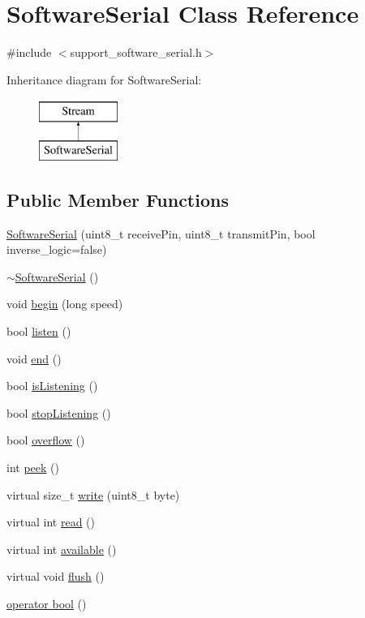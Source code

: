 \hypertarget{class_software_serial}{}\section{Software\+Serial Class Reference}
\label{class_software_serial}


{\ttfamily \#include $<$support\+\_\+software\+\_\+serial.\+h$>$}

Inheritance diagram for Software\+Serial\+:\begin{figure}[H]
\begin{center}
\leavevmode
\includegraphics[height=2.000000cm]{class_software_serial}
\end{center}
\end{figure}
\subsection*{Public Member Functions}
\begin{DoxyCompactItemize}
\item 
\hyperlink{class_software_serial_aab36336db4a1ca5073071c07d910cb87}{Software\+Serial} (uint8\+\_\+t receive\+Pin, uint8\+\_\+t transmit\+Pin, bool inverse\+\_\+logic=false)
\item 
\hyperlink{class_software_serial_af6b8fff282e09a6cecc5df669ae71ee7}{$\sim$\+Software\+Serial} ()
\item 
void \hyperlink{class_software_serial_af1b194359d70894b3a2f38236a68480e}{begin} (long speed)
\item 
bool \hyperlink{class_software_serial_ad235539ef28939836bd0bde9387eb8fc}{listen} ()
\item 
void \hyperlink{class_software_serial_a9034270f7de617b3cc7d3f38f3a8e0df}{end} ()
\item 
bool \hyperlink{class_software_serial_a7b3fb4a8f57d2b5f2233f841d71ef80f}{is\+Listening} ()
\item 
bool \hyperlink{class_software_serial_a1c87a6b43c176c104f28e2c2eec2841e}{stop\+Listening} ()
\item 
bool \hyperlink{class_software_serial_ac6d4d5dfbe05515bf23766e2c8abfd46}{overflow} ()
\item 
int \hyperlink{class_software_serial_a51c2d2e79f0d982b1ef9cc9ac4453648}{peek} ()
\item 
virtual size\+\_\+t \hyperlink{class_software_serial_ac24e5c6af203ec636c0a200b0cb3caf0}{write} (uint8\+\_\+t byte)
\item 
virtual int \hyperlink{class_software_serial_a2d0b2f2868d519c716114777f482705b}{read} ()
\item 
virtual int \hyperlink{class_software_serial_a4cbf77a4e90e15ca576972d7952659c5}{available} ()
\item 
virtual void \hyperlink{class_software_serial_a9a46db376a19fc958e011e38799b902c}{flush} ()
\item 
\hyperlink{class_software_serial_ab0cba63b2a27fcfa4760a2f3f7389de0}{operator bool} ()
\end{DoxyCompactItemize}
